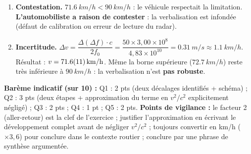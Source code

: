 \documentclass[11pt]{article}
\begin{document}
\begin{corrige}
\begin{enumerate}
    \item \textbf{Contestation.} $\SI{71,6}{km/h} < \SI{90}{km/h}$ : le véhicule respectait la limitation. \textbf{L'automobiliste a raison de contester} : la verbalisation est infondée (défaut de calibration ou erreur de lecture du radar).
    \item \textbf{Incertitude.} $\Delta v = \dfrac{\Delta(\Delta f) \cdot c}{2 f_0} = \dfrac{50 \times 3,00\times10^{8}}{4,83\times10^{10}} = \SI{0,31}{m/s} \approx \SI{1,1}{km/h}$.
    Résultat : $v = \SI{71,6 \pm 1,1}{km/h}$. Même la borne supérieure ($\SI{72,7}{km/h}$) reste très inférieure à $\SI{90}{km/h}$ : la verbalisation n'est \textbf{pas robuste}.
\end{enumerate}
\textbf{Barème indicatif (sur 10) :} Q1 : 2 pts (deux décalages identifiés + schéma) ; Q2 : 3 pts (deux étapes + approximation du terme en $v^2/c^2$ explicitement négligé) ; Q3 : 2 pts ; Q4 : 1 pt ; Q5 : 2 pts.
\textbf{Points de vigilance :} le facteur 2 (aller-retour) est la clef de l'exercice ; justifier l'approximation en écrivant le développement complet avant de négliger $v^2/c^2$ ; toujours convertir en km/h ($\times 3,6$) pour conclure dans le contexte routier ; conclure par une phrase de synthèse argumentée.
\end{corrige}
\end{document}

